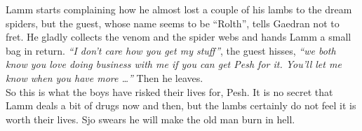Lamm starts complaining how he almost lost a couple of his lambs to the dream spiders, but the guest, whose name seems to be ``Rolth'', tells Gaedran not to fret. He gladly collects the venom and the spider webs and hands Lamm a small bag in return. {\itshape ``I don't care how you get my stuff''}, the guest hisses, {\itshape ``we both know you love doing business with me if you can get Pesh for it. You'll let me know when you have more \ldots''} Then he leaves.\\

So this is what the boys have risked their lives for, Pesh. It is no secret that Lamm deals a bit of drugs now and then, but the lambs certainly do not feel it is worth their lives. Sjo swears he will make the old man burn in hell.\\


